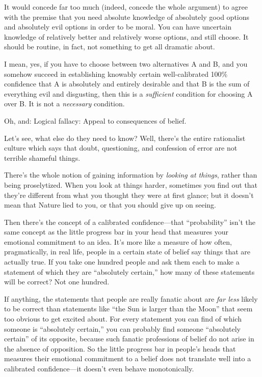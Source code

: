 {
 It would concede far too much (indeed, concede the whole argument)
to agree with the premise that you need absolute knowledge of
absolutely good options and absolutely evil options in order to be
moral. You can have uncertain knowledge of relatively better and
relatively worse options, and still choose. It should be routine, in
fact, not something to get all dramatic about.}

{
 I mean, yes, if you have to choose between two alternatives A and
B, and you somehow succeed in establishing knowably certain
well-calibrated 100\% confidence that A is absolutely and entirely
desirable and that B is the sum of everything evil and disgusting, then
this is a \textit{sufficient} condition for choosing A over B. It is
not a \textit{necessary} condition.}

{
 Oh, and: Logical fallacy: Appeal to consequences of belief.}

{
 Let's see, what else do they need to know? Well,
there's the entire rationalist culture which says that
doubt, questioning, and confession of error are not terrible shameful
things.}

{
 There's the whole notion of gaining information by
\textit{looking at things}, rather than being proselytized. When you
look at things harder, sometimes you find out that
they're different from what you thought they were at
first glance; but it doesn't mean that Nature lied to
you, or that you should give up on seeing.}

{
 Then there's the concept of a calibrated
confidence---that ``probability''
isn't the same concept as the little progress bar in
your head that measures your emotional commitment to an idea.
It's more like a measure of how often, pragmatically,
in real life, people in a certain state of belief say things that are
actually true. If you take one hundred people and ask them each to make
a statement of which they are ``absolutely
certain,'' how many of these statements will be
correct? Not one hundred.}

{
 If anything, the statements that people are really fanatic about
are \textit{far less} likely to be correct than statements like
``the Sun is larger than the Moon''
that seem too obvious to get excited about. For every statement you can
find of which someone is ``absolutely
certain,'' you can probably find someone
``absolutely certain'' of its
opposite, because such fanatic professions of belief do not arise in
the absence of opposition. So the little progress bar in
people's heads that measures their emotional commitment
to a belief does not translate well into a calibrated confidence---it
doesn't even behave monotonically.}

